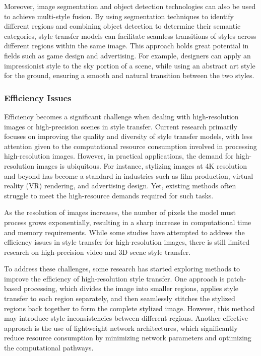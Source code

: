 \documentclass[preprint,12pt]{elsarticle}
\begin{document}
Moreover, image segmentation and object detection technologies can also be used to achieve multi-style fusion. By using segmentation techniques to identify different regions and combining object detection to determine their semantic categories, style transfer models can facilitate seamless transitions of styles across different regions within the same image. This approach holds great potential in fields such as game design and advertising. For example, designers can apply an impressionist style to the sky portion of a scene, while using an abstract art style for the ground, ensuring a smooth and natural transition between the two styles.

\subsubsection{Efficiency Issues}

Efficiency becomes a significant challenge when dealing with high-resolution images or high-precision scenes in style transfer. Current research primarily focuses on improving the quality and diversity of style transfer models, with less attention given to the computational resource consumption involved in processing high-resolution images. However, in practical applications, the demand for high-resolution images is ubiquitous. For instance, stylizing images at 4K resolution and beyond has become a standard in industries such as film production, virtual reality (VR) rendering, and advertising design. Yet, existing methods often struggle to meet the high-resource demands required for such tasks.

As the resolution of images increases, the number of pixels the model must process grows exponentially, resulting in a sharp increase in computational time and memory requirements. While some studies have attempted to address the efficiency issues in style transfer for high-resolution images, there is still limited research on high-precision video and 3D scene style transfer.

To address these challenges, some research has started exploring methods to improve the efficiency of high-resolution style transfer. One approach is patch-based processing, which divides the image into smaller regions, applies style transfer to each region separately, and then seamlessly stitches the stylized regions back together to form the complete stylized image. However, this method may introduce style inconsistencies between different regions. Another effective approach is the use of lightweight network architectures, which significantly reduce resource consumption by minimizing network parameters and optimizing the computational pathways.
\end{document}
